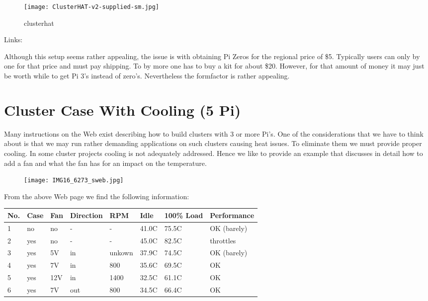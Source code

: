 \begin{figure}
\centering
\texttt{[image: ClusterHAT-v2-supplied-sm.jpg]}
\caption{clusterhat}
\end{figure}



Links:




Although this setup seems rather appealing, the issue is with obtaining
Pi Zeros for the regional price of \$5. Typically users can only by one
for that price and must pay shipping. To by more one has to buy a kit
for about \$20. However, for that amount of money it may just be worth
while to get Pi 3's instead of zero's. Nevertheless the formfactor is
rather appealing.

\section{Cluster Case With Cooling (5 Pi)}\label{S:cluster-case-with-cooling-5-pi}

Many instructions on the Web exist describing how to build clusters with
3 or more Pi's. One of the considerations that we have to think about is
that we may run rather demanding applications on such clusters causing
heat issues. To eliminate them we must provide proper cooling. In some
cluster projects cooling is not adequately addressed. Hence we like to
provide an example that discusses in detail how to add a fan and what the
fan has for an impact on the temperature.

\begin{figure}
\centering
\texttt{[image: IMG16\_6273\_sweb.jpg]}
\caption{}
\end{figure}





From the above Web page we find the following information:

\begin{longtable}[]{@{}llllllll@{}}
\toprule
No. & Case & Fan & Direction & RPM & Idle & 100\% Load &
Performance\tabularnewline
\midrule
\endhead
1 & no & no & - & - & 41.0C & 75.5C & OK (barely)\tabularnewline
2 & yes & no & - & - & 45.0C & 82.5C & throttles\tabularnewline
3 & yes & 5V & in & unkown & 37.9C & 74.5C & OK (barely)\tabularnewline
4 & yes & 7V & in & 800 & 35.6C & 69.5C & OK\tabularnewline
5 & yes & 12V & in & 1400 & 32.5C & 61.1C & OK\tabularnewline
6 & yes & 7V & out & 800 & 34.5C & 66.4C & OK\tabularnewline
\bottomrule
\end{longtable}


